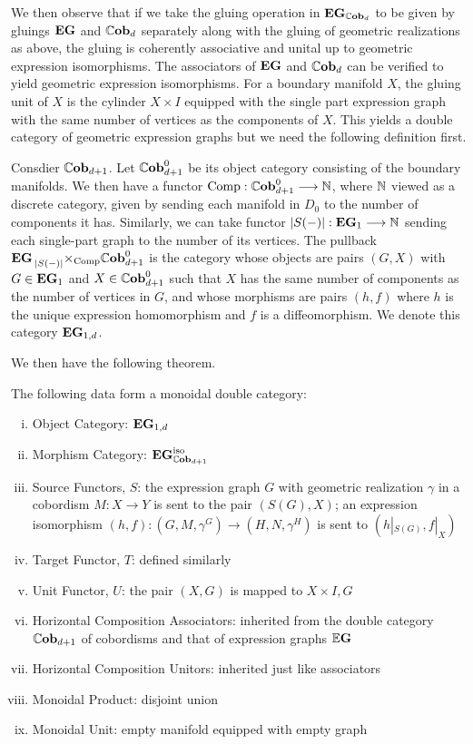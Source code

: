 \documentclass[./Thick_TQFTs_and_Quantum_Information.tex]{subfiles}
\begin{document}
We then observe that if we take the gluing
operation in $\textbf{EG}_{\mathbb{C}\textbf{ob}_{d}}$ to be given by gluings $\textbf{EG}$ and $\mathbb{C}\textbf{ob}_{d}$
separately along with the gluing of geometric realizations as above, the gluing
is coherently associative and unital up to geometric expression isomorphisms.
The associators of $\textbf{EG}$ and $\mathbb{C}\textbf{ob}_{d}$ can be verified to yield geometric
expression isomorphisms. For a boundary manifold $X$, the gluing unit of $X$ is
the cylinder $X \times I$ equipped with the single part expression graph with
the same number of vertices as the components of $X$. This yields a double
category of geometric expression graphs but we need the following definition
first.

\begin{defn}
Consdier $\mathbb{C}\textbf{ob}_{d + 1}$. Let $\mathbb{C}\textbf{ob}_{d + 1}^0$ be its object category
consisting of the boundary manifolds. We then have a functor
$\text{Comp} : \mathbb{C}\textbf{ob}_{d + 1}^0 \stackrel{}{\longrightarrow} \mathbb{N}$, where $\mathbb{N}$ viewed as a discrete
category, given by sending each manifold in $D_0$ to the number of components it
has. Similarly, we can take functor $|S(-)| : \textbf{EG}_1 \stackrel{}{\longrightarrow} \mathbb{N}$ sending each
single-part graph to the number of its vertices. The pullback
$\textbf{EG} \prescript{}{|S(-)|}{\times}_{\text{Comp}} \mathbb{C}\textbf{ob}_{d + 1}^0$ is the category
whose objects are pairs $(G, X)$ with $G \in \textbf{EG}_1$ and $X \in \mathbb{C}\textbf{ob}_{d + 1}^0$
such that $X$ has the same number of components as the number of vertices in
$G$, and whose morphisms are pairs $(h, f)$ where $h$ is the unique expression
homomorphism and $f$ is a diffeomorphism. We denote this category $\textbf{EG}_{1, d}$.
\end{defn}

We then have the following theorem. 

\begin{thm}
The following data form a monoidal double category:
\begin{enumerate}[(i)]
\setlength{\itemsep}{0pt}
\item Object Category: $\textbf{EG}_{1, d}$
\item Morphism Category: $\textbf{EG}_{\mathbb{C}\textbf{ob}_{d + 1}}^{\text{iso}}$
\item Source Functors, $S$: the expression graph $G$ with
geometric realization $\gamma$ in a cobordism $M : X \to Y$ is sent to the pair
$(S(G), X)$; an expression isomorphism
$(h, f) : (G, M, \gamma^G) \to (H, N, \gamma^H)$
is sent to $(h|_{S(G)}, f|_{X})$
\item Target Functor, $T$: defined similarly
\item Unit Functor, $U$: the pair $(X, G)$ is mapped to $X \times I, G$
\item Horizontal Composition Associators: inherited from the double category
$\mathbb{C}\textbf{ob}_{d + 1}$ of cobordisms and that of expression graphs $\mathbb{E}\textbf{G}$
\item Horizontal Composition Unitors: inherited just like associators
\item Monoidal Product: disjoint union
\item Monoidal Unit: empty manifold equipped with empty graph
\end{enumerate}
\end{thm}
\end{document}
